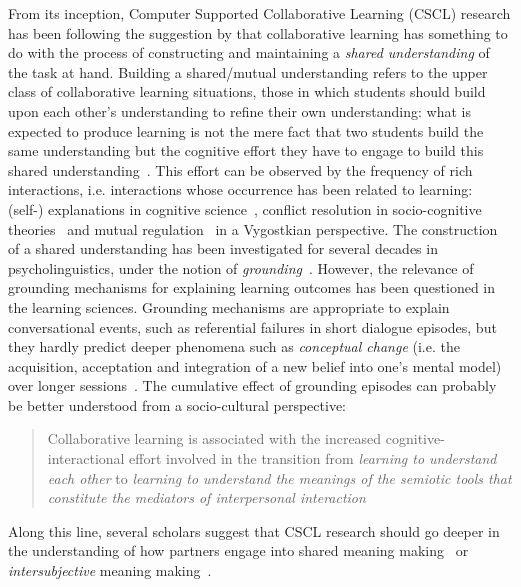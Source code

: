 \documentclass[natbib]{svjour3}
\newcommand{\ie}{i.e.\xspace}
\begin{document}
From its inception, Computer Supported Collaborative Learning (CSCL)
research has been following the suggestion by \citet{roschelle1995construction}
that collaborative learning has something to do with the process of constructing
and maintaining a \emph{shared understanding} of the task at hand. Building a
shared/mutual understanding refers to the upper class of collaborative learning
situations, those in which students should build upon each other's understanding
to refine their own understanding: what is expected to produce learning is not
the mere fact that two students build the same understanding but the cognitive
effort they have to engage to build this shared
understanding~\citep{schwartz1995emergence}. This effort can be observed by the
frequency of rich interactions, \ie interactions whose occurrence has been
related to learning: (self-) explanations in cognitive
science~\citep{chi1989self, webb1991task}, conflict resolution in
socio-cognitive theories~\citep{doise1975social} and mutual
regulation~\citep{blaye1995collaborative} in a Vygostkian perspective. The
construction of a shared understanding has been investigated for several decades
in psycholinguistics, under the  notion of
\emph{grounding}~\citep{clark1986referring}. However, the relevance of grounding
mechanisms for explaining learning outcomes has been questioned in the learning
sciences. Grounding mechanisms are appropriate to explain conversational
events, such as referential failures in short dialogue episodes, but they hardly
predict deeper phenomena such as \emph{conceptual change} (\ie the acquisition,
acceptation and integration of a new belief into one's mental model) over longer
sessions~\citep{dillenbourg2006sharing}. The cumulative effect of grounding
episodes can probably be better understood from a socio-cultural perspective:

\begin{quote}
Collaborative learning is associated with the increased
cognitive-interactional effort involved in the transition from \emph{learning to
understand each other} to \emph{learning to understand the meanings of the semiotic
tools that constitute the mediators of interpersonal
interaction}~\citep{baker1999role}
\end{quote}

Along this line, several scholars suggest that CSCL research should go deeper in
the understanding of how partners engage into shared meaning
making~\citep{stahl2007meaning} or \emph{intersubjective} meaning
making~\citep{suthers2006technology}.
\end{document}
